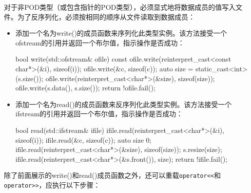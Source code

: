 对于非POD类型（或包含指针的POD类型），必须显式地将数据成员的值写入文件。为了反序列化，必须按相同的顺序从文件读取到数据成员：

\begin{itemize}
\item
添加一个名为write()的成员函数来序列化此类型实例。该方法接受一个ofstream的引用并返回一个布尔值，指示操作是否成功：

\begin{cpp}
bool write(std::ofstream& ofile) const
{
    ofile.write(reinterpret_cast<const char*>(&i), sizeof(i));
    ofile.write(&c, sizeof(c));
    auto size = static_cast<int>(s.size());
    ofile.write(reinterpret_cast<char*>(&size), sizeof(size));
    ofile.write(s.data(), s.size());
    return !ofile.fail();
}
\end{cpp}

\item
添加一个名为read()的成员函数来反序列化此类型实例。该方法接受一个ifstream的引用并返回一个布尔值，指示操作是否成功：

\begin{cpp}
bool read(std::ifstream& ifile)
{
    ifile.read(reinterpret_cast<char*>(&i), sizeof(i));
    ifile.read(&c, sizeof(c));
    auto size {0};
    ifile.read(reinterpret_cast<char*>(&size), sizeof(size));
    s.resize(size);
    ifile.read(reinterpret_cast<char*>(&s.front()), size);
    return !ifile.fail();
}
\end{cpp}
\end{itemize}

除了前面展示的write()和read()成员函数之外，还可以重载\verb|operator<<|和\verb|operator>>|，应执行以下步骤：


